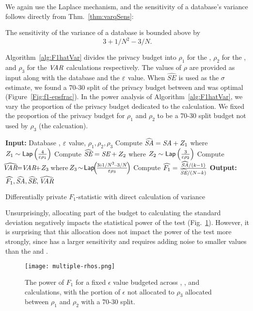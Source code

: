 We again use the Laplace mechanism, and the sensitivity of a database's variance follows directly from Thm.~\ref{thm:varqSens}:

\begin{corollary}
\label{thm:varsens}
The sensitivity of the variance of a database is bounded above by
$$ 3 + 1/N^2 - 3/N.$$
\end{corollary}

Algorithm~\ref{alg:F1hatVar} divides the privacy budget into $\rho_1$ for the \sa, $\rho_2$ for the \se, and $\rho_3$ for the $\textit{VAR}$ calculations respectively.  The values of $\rho$ are provided as input along with the database \x and the $\varepsilon$ value. When $\widehat{SE}$ is used as the $\sigma$ estimate, we found a 70-30 split of the privacy budget between \sa and \se was optimal (Figure~\ref{Fig:f1-epsfrac}).   In the power analysis of Algorithm~\ref{alg:F1hatVar}, we vary the proportion of the privacy budget dedicated to the \var calculation.  We fixed the proportion of the privacy budget for $\rho_1$ and $\rho_2$ to be a 70-30 split budget not used by $\rho_3$ (the \var calcuation).  

\begin{algorithm}
    \begin{algorithmic}
        \STATE \textbf{Input:} Database \x, $\varepsilon$ value, $\rho_1, \rho_2, \rho_3$
        \STATE Compute $\widehat{\textit{SA}} = \textit{SA} + Z_1$ where $Z_1\sim {\sf Lap}\left(\frac{4}{\varepsilon \rho_1}\right)$
        \STATE Compute $\widehat{\textit{SE}} = \textit{SE}+ Z_2$ where $Z_2\sim {\sf Lap}\left(\frac{3}{\varepsilon \rho_2}\right)$
        \STATE Compute $\!\!\widehat{\var} \!\!= \!\!\var \!\!+\! Z_3\!$ where  $\!Z_3 \!\sim\! \lap\!\!\left(\! \frac{3\!+\!1/N^2\! - \!3/N}{\eps\rho_3} \!\right)$
        \STATE Compute $\widehat{F_1} = \frac{\widehat{\textit{SA}}/(k-1)}{\widehat{\textit{SE}}/(N-k)}$
        \STATE \textbf{Output:} $\widehat{F_1}, \widehat{\textit{SA}}, \widehat{\textit{SE}}, \widehat{\textit{VAR}}$
    \end{algorithmic}
    \caption{Differentially private $F_1$-statistic with direct calculation of variance}
     \label{alg:F1hatVar}
\end{algorithm}

Unsurprisingly, allocating part of the budget to calculating the standard deviation negatively impacts the statistical power of the test (Fig.~\ref{Fig:multiple-rhos}). However, it is surprising that this allocation does not impact the power of the test more strongly, since \var has a larger sensitivity and requires adding noise to smaller values than the \sa and \se. 

\begin{figure}[h]
\centering
\texttt{[image: multiple-rhos.png]}
\caption{The power of $F_1$ for a fixed $\epsilon$ value budgeted across \sa, \se, and \var calculations, with the portion of $\epsilon$ not allocated to $\rho_3$ allocated between $\rho_1$ and $\rho_2$ with a 70-30 split.\label{Fig:multiple-rhos}}
\end{figure}
